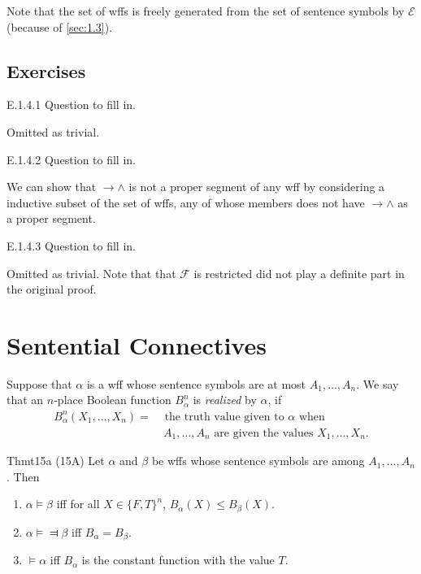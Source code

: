 Note that the set of wffs is freely generated from the set of sentence symbols by $\mathcal{E}$ (because of \ref{sec:1.3}).

\subsection*{Exercises}

\begin{exercise}{E.1.4.1}
  Question to fill in.
\end{exercise}

Omitted as trivial.

\begin{exercise}{E.1.4.2}
  Question to fill in.
\end{exercise}

We can show that $\rightarrow\wedge$ is not a proper segment of any wff by considering a inductive subset of the set of wffs, any of whose members does not have $\rightarrow\wedge$ as a proper segment.

\begin{exercise}{E.1.4.3}
  Question to fill in.
\end{exercise}

Omitted as trivial. Note that that $\mathcal{F}$ is restricted did not play a definite part in the original proof.

\section{Sentential Connectives}

Suppose that $\alpha$ is a wff whose sentence symbols are at most $A_1,\dots,A_n$. We say that an $n$-place Boolean function $B_\alpha^n$ is \textit{realized} by $\alpha$, if
\begin{align*}
  B_{\alpha}^n(X_1,\dots,X_n)= & \text{ the truth value given to $\alpha$ when}             \\
                               & \ A_1,\dots,A_n\text{ are given the values }X_1,\dots,X_n.
\end{align*}

\begin{reference}{Thm}{t15a}
  (15A) Let $\alpha$ and $\beta$ be wffs whose sentence symbols are among $A_1,\dots,A_n$. Then
  \begin{enumerate}
    \item $\alpha\vDash \beta$ iff for all $X\in\{F,T\}^n$, $B_{\alpha}(X)\leq B_{\beta}(X)$.
    \item $\alpha\vDash\Dashv \beta$ iff $B_{\alpha}=B_{\beta}$.
    \item $\vDash \alpha$ iff $B_{\alpha}$ is the constant function with the value $T$.\qedhere
  \end{enumerate}
\end{reference}


